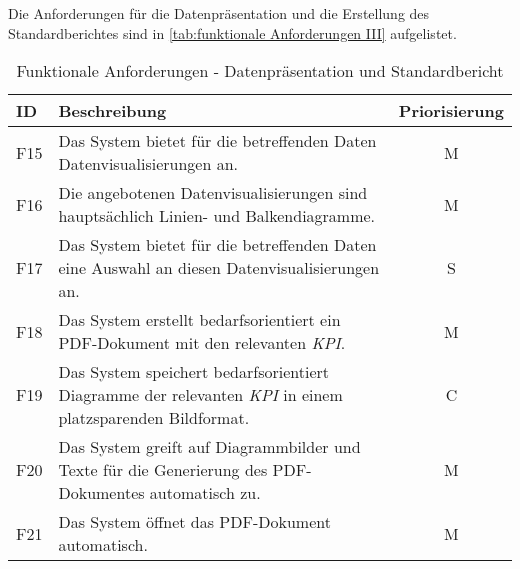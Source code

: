 Die Anforderungen für die Datenpräsentation und die Erstellung des Standardberichtes sind in \autoref{tab:funktionale Anforderungen III} aufgelistet.
\begingroup
\setlength{\tabcolsep}{10pt} %
\renewcommand{\arraystretch}{1.25} 
\begin{table}[h]
    \centering
    \begin{adjustbox}{max width=\textwidth}
    \begin{tabular}{lp{15cm}c}
       \toprule
       \textbf{ID}          & \textbf{Beschreibung} &\textbf{Priorisierung}\\
       \midrule
        F15                              &Das System bietet für die betreffenden Daten Datenvisualisierungen an. & M\\
        F16                              &Die angebotenen Datenvisualisierungen sind hauptsächlich Linien- und Balkendiagramme. & M\\
        F17                              &Das System bietet für die betreffenden Daten eine Auswahl an diesen Datenvisualisierungen an. & S\\
        F18                              &Das System erstellt bedarfsorientiert ein PDF-Dokument mit den relevanten \textit{\acrshort{KPI}}. & M\\
        F19                              &Das System speichert bedarfsorientiert Diagramme der relevanten \textit{\acrshort{KPI}} in einem platzsparenden Bildformat. & C\\
        F20                              &Das System greift auf Diagrammbilder und Texte für die Generierung des PDF-Dokumentes automatisch zu. &M\\
        F21                              &Das System öffnet das PDF-Dokument automatisch. & M\\
        \bottomrule
    \end{tabular}
    \end{adjustbox}
    \caption{%
        Funktionale Anforderungen - Datenpräsentation und Standardbericht
    }
    \label{tab:funktionale Anforderungen III}
    \end{table}
\endgroup



